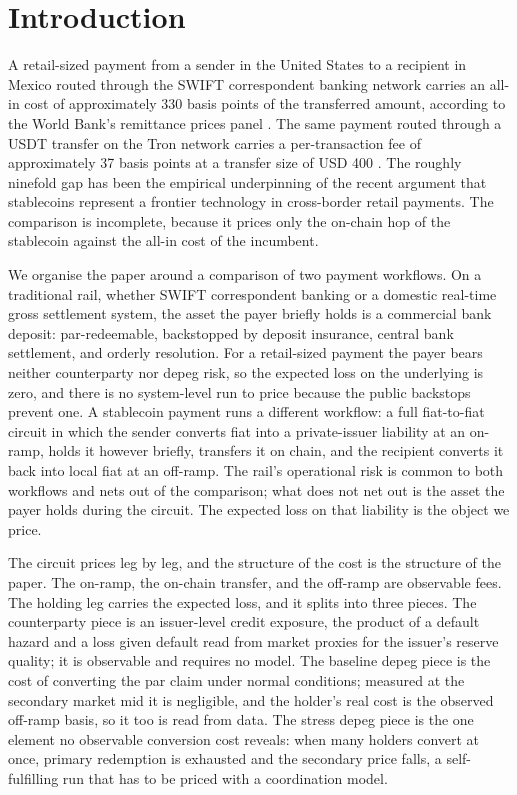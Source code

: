 \section{Introduction}\label{sec:introduction}

A retail-sized payment from a sender in the United States to a recipient in Mexico routed through the SWIFT correspondent banking network carries an all-in cost of approximately 330 basis points of the transferred amount, according to the World Bank's remittance prices panel \citep{rpw_q3_2025}. The same payment routed through a USDT transfer on the Tron network carries a per-transaction fee of approximately 37 basis points at a transfer size of USD 400 \citep{tronsave_blog_2026}. The roughly ninefold gap has been the empirical underpinning of the recent argument that stablecoins represent a frontier technology in cross-border retail payments. The comparison is incomplete, because it prices only the on-chain hop of the stablecoin against the all-in cost of the incumbent.

We organise the paper around a comparison of two payment workflows. On a traditional rail, whether SWIFT correspondent banking or a domestic real-time gross settlement system, the asset the payer briefly holds is a commercial bank deposit: par-redeemable, backstopped by deposit insurance, central bank settlement, and orderly resolution. For a retail-sized payment the payer bears neither counterparty nor depeg risk, so the expected loss on the underlying is zero, and there is no system-level run to price because the public backstops prevent one. A stablecoin payment runs a different workflow: a full fiat-to-fiat circuit in which the sender converts fiat into a private-issuer liability at an on-ramp, holds it however briefly, transfers it on chain, and the recipient converts it back into local fiat at an off-ramp. The rail's operational risk is common to both workflows and nets out of the comparison; what does not net out is the asset the payer holds during the circuit. The expected loss on that liability is the object we price.

The circuit prices leg by leg, and the structure of the cost is the structure of the paper. The on-ramp, the on-chain transfer, and the off-ramp are observable fees. The holding leg carries the expected loss, and it splits into three pieces. The counterparty piece is an issuer-level credit exposure, the product of a default hazard and a loss given default read from market proxies for the issuer's reserve quality; it is observable and requires no model. The baseline depeg piece is the cost of converting the par claim under normal conditions; measured at the secondary market mid it is negligible, and the holder's real cost is the observed off-ramp basis, so it too is read from data. The stress depeg piece is the one element no observable conversion cost reveals: when many holders convert at once, primary redemption is exhausted and the secondary price falls, a self-fulfilling run that has to be priced with a coordination model.

